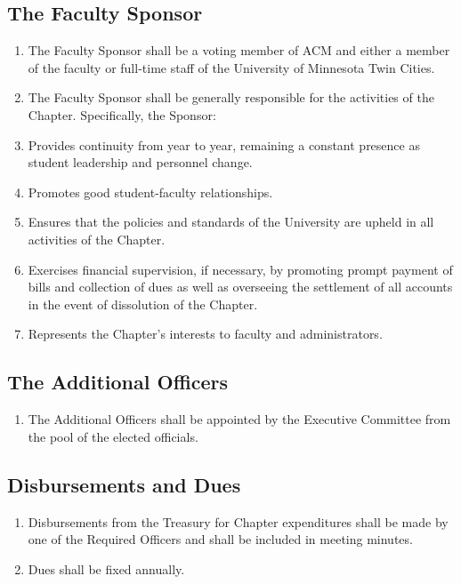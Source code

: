 \subsection{The Faculty Sponsor}
\begin{enumerate}
	\item The Faculty Sponsor shall be a voting member of ACM and either a member of the faculty or full-time staff of the University of Minnesota Twin Cities.
	\item The Faculty Sponsor shall be generally responsible for the activities of the Chapter. Specifically, the Sponsor:
	\item Provides continuity from year to year, remaining a constant presence as student leadership and personnel change.
	\item Promotes good student-faculty relationships.
	\item Ensures that the policies and standards of the University are upheld in all activities of the Chapter.
	\item Exercises financial supervision, if necessary, by promoting prompt payment of bills and collection of dues as well as overseeing the settlement of all accounts in the event of dissolution of the Chapter.
	\item Represents the Chapter’s interests to faculty and administrators.
\end{enumerate}

\subsection{The Additional Officers}
\begin{enumerate}
	\item The Additional Officers shall be appointed by the Executive Committee from the pool of the elected officials. 
\end{enumerate}

\subsection{Disbursements and Dues}
\begin{enumerate}
	\item Disbursements from the Treasury for Chapter expenditures shall be made by one of the Required Officers and shall be included in meeting minutes.
	\item Dues shall be fixed annually.
\end{enumerate}

